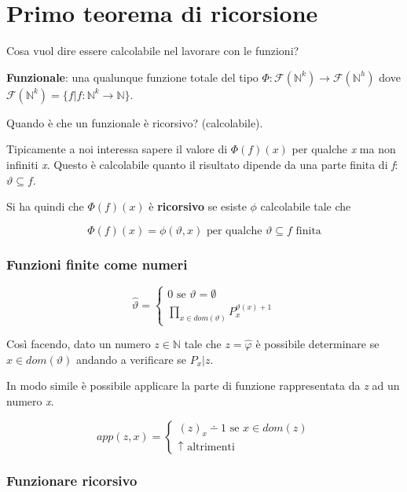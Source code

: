 
\section{Primo teorema di ricorsione}

Cosa vuol dire essere calcolabile nel lavorare con le funzioni?

\textbf{Funzionale}: una qualunque funzione totale del tipo $\Phi : \mathcal{F}(\mathbb{N}^k) \rightarrow  \mathcal{F}(\mathbb{N}^h) $ dove $\mathcal{F}(\mathbb{N}^k) = \{ f | f : \mathbb{N}^k \rightarrow \mathbb{N} \}$.

Quando è che un funzionale è ricorsivo? (calcolabile).

Tipicamente a noi interessa sapere il valore di $\Phi(f)(x)$ per qualche \textit{x} ma non infiniti \textit{x}.
Questo è calcolabile quanto il risultato dipende da una parte finita di \textit{f}: $\vartheta \subseteq f$.

Si ha quindi che $\Phi (f) (x)$ è \textbf{ricorsivo} se esiste $\phi$ calcolabile tale che

$$
\Phi(f)(x) = \phi(\vartheta, x) \text{ per qualche }\vartheta \subseteq f \text{ finita}
$$

\subsubsection{Funzioni finite come numeri}

$$
\hat{\vartheta} = \begin{cases}
0 \text{ se } \vartheta = \emptyset \\
\prod\limits_{x \in dom(\vartheta)} P_{x}^{\vartheta(x) +1}
\end{cases}
$$

Così facendo, dato un numero $z \in \mathbb{N}$ tale che $z = \hat{\varphi}$ è possibile determinare se $x \in dom(\vartheta)$ andando a verificare se $ P_x | z$.

In modo simile è possibile applicare la parte di funzione rappresentata da \textit{z} ad un numero \textit{x}.

$$
app(z, x) = \begin{cases}
(z)_x \dotminus 1 \text{ se } x \in dom(z)\\
\uparrow \text{ altrimenti}
\end{cases}
$$

\subsubsection{Funzionare ricorsivo}

